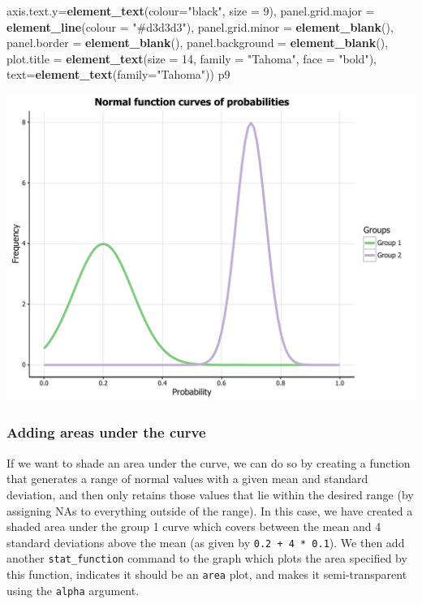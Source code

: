 \documentclass[]{article}
\newenvironment{Shaded}{\begin{snugshade}}{\end{snugshade}}
\newcommand{\KeywordTok}[1]{\textcolor[rgb]{0.13,0.29,0.53}{\textbf{{#1}}}}
\newcommand{\DataTypeTok}[1]{\textcolor[rgb]{0.13,0.29,0.53}{{#1}}}
\newcommand{\DecValTok}[1]{\textcolor[rgb]{0.00,0.00,0.81}{{#1}}}
\newcommand{\StringTok}[1]{\textcolor[rgb]{0.31,0.60,0.02}{{#1}}}
\newcommand{\NormalTok}[1]{{#1}}
\begin{document}
\begin{Shaded}
\begin{Highlighting}[]
            \DataTypeTok{axis.text.y=}\KeywordTok{element_text}\NormalTok{(}\DataTypeTok{colour=}\StringTok{"black"}\NormalTok{, }\DataTypeTok{size =} \DecValTok{9}\NormalTok{), }
            \DataTypeTok{panel.grid.major =} \KeywordTok{element_line}\NormalTok{(}\DataTypeTok{colour =} \StringTok{"#d3d3d3"}\NormalTok{), }
            \DataTypeTok{panel.grid.minor =} \KeywordTok{element_blank}\NormalTok{(), }
            \DataTypeTok{panel.border =} \KeywordTok{element_blank}\NormalTok{(), }\DataTypeTok{panel.background =} \KeywordTok{element_blank}\NormalTok{(),}
            \DataTypeTok{plot.title =} \KeywordTok{element_text}\NormalTok{(}\DataTypeTok{size =} \DecValTok{14}\NormalTok{, }\DataTypeTok{family =} \StringTok{"Tahoma"}\NormalTok{, }\DataTypeTok{face =} \StringTok{"bold"}\NormalTok{),}
            \DataTypeTok{text=}\KeywordTok{element_text}\NormalTok{(}\DataTypeTok{family=}\StringTok{"Tahoma"}\NormalTok{))}
\NormalTok{p9}
\end{Highlighting}
\end{Shaded}

\begin{center}\includegraphics{0_all_posts_pdf/function_16-1} \end{center}

\subsubsection{Adding areas under the
curve}\label{adding-areas-under-the-curve}

If we want to shade an area under the curve, we can do so by creating a
function that generates a range of normal values with a given mean and
standard deviation, and then only retains those values that lie within
the desired range (by assigning NAs to everything outside of the range).
In this case, we have created a shaded area under the group 1 curve
which covers between the mean and 4 standard deviations above the mean
(as given by \texttt{0.2\ +\ 4\ *\ 0.1}). We then add another
\texttt{stat\_function} command to the graph which plots the area
specified by this function, indicates it should be an \texttt{area}
plot, and makes it semi-transparent using the \texttt{alpha} argument.
\end{document}
